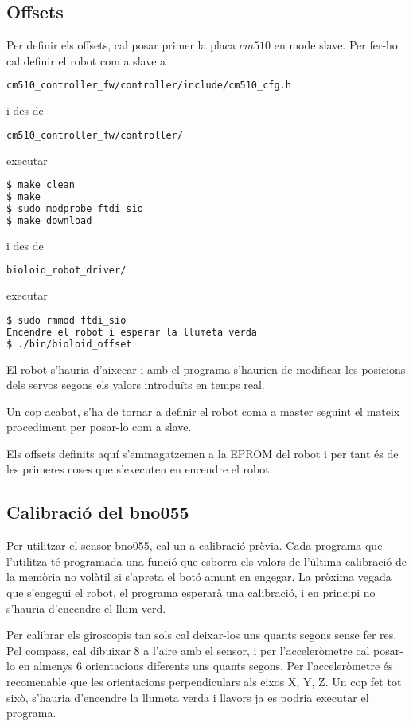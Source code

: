 \documentclass{article}
\begin{document}
\subsection{Offsets}
Per definir els offsets, cal posar primer la placa $cm510$ en mode slave. Per fer-ho cal definir el robot com a slave a 
\begin{lstlisting}[language=bash]
cm510_controller_fw/controller/include/cm510_cfg.h
\end{lstlisting}
i des de 
\begin{lstlisting}[language=bash]
cm510_controller_fw/controller/
\end{lstlisting}
executar
\begin{lstlisting}[language=bash]
$ make clean
$ make
$ sudo modprobe ftdi_sio
$ make download
\end{lstlisting}
i des de 
\begin{lstlisting}[language=bash]
bioloid_robot_driver/
\end{lstlisting}
executar
\begin{lstlisting}[language=bash]
$ sudo rmmod ftdi_sio
Encendre el robot i esperar la llumeta verda
$ ./bin/bioloid_offset
\end{lstlisting}
El robot s'hauria d'aixecar i amb el programa s'haurien de modificar les posicions dels servos segons els valors introduïts en temps real.

Un cop acabat, s'ha de tornar a definir el robot coma a master seguint el mateix procediment per posar-lo com a slave.

Els offsets definits aquí s'emmagatzemen a la EPROM del robot i per tant és de les primeres coses que s'executen en encendre el robot. 

\subsection{Calibració del bno055}
Per utilitzar el sensor bno055, cal un a calibració prèvia. Cada programa que l'utilitza té programada una funció que esborra els valors de l'última calibració de la memòria no volàtil si s'apreta el botó amunt en engegar. La pròxima vegada que s'engegui el robot, el programa esperarà una calibració, i en principi no s'hauria d'encendre el llum verd. 

Per calibrar els giroscopis tan sols cal deixar-los uns quants segons sense fer res. Pel compass, cal dibuixar 8 a l'aire amb el sensor, i per l'acceleròmetre cal posar-lo en almenys 6 orientacions diferents uns quants segons. Per l'acceleròmetre és recomenable que les orientacions perpendiculars als eixos X, Y, Z. Un cop fet tot sixò, s'hauria d'encendre la llumeta verda i llavors ja es podria executar el programa.
\end{document}
